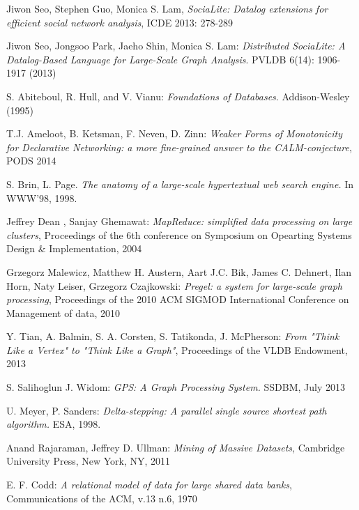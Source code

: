 
\begin{thebibliography}{99}


 Jiwon Seo, Stephen Guo, Monica S. Lam, \textit{SociaLite: Datalog extensions for efficient social network analysis}, ICDE 2013: 278-289

 Jiwon Seo, Jongsoo Park, Jaeho Shin, Monica S. Lam: \textit{Distributed SociaLite: A Datalog-Based Language for Large-Scale Graph Analysis}. PVLDB 6(14): 1906-1917 (2013)

 S. Abiteboul, R. Hull, and V. Vianu: \textit{Foundations of Databases}. Addison-Wesley (1995)

 T.J. Ameloot, B. Ketsman, F. Neven, D. Zinn: \textit{Weaker Forms of Monotonicity for Declarative Networking: a more fine-grained answer to the CALM-conjecture}, PODS 2014

 S. Brin, L. Page. \textit{The anatomy of a large-scale hypertextual web search engine.} In WWW’98, 1998.

 Jeffrey Dean , Sanjay Ghemawat: \textit{MapReduce: simplified data processing on large clusters}, Proceedings of the 6th conference on Symposium on Opearting Systems Design \& Implementation, 2004

 Grzegorz Malewicz, Matthew H. Austern, Aart J.C. Bik, James C. Dehnert, Ilan Horn, Naty Leiser, Grzegorz Czajkowski: \textit{Pregel: a system for large-scale graph processing}, Proceedings of the 2010 ACM SIGMOD International Conference on Management of data, 2010

 Y. Tian, A. Balmin, S. A. Corsten, S. Tatikonda, J. McPherson: \textit{From "Think Like a Vertex" to "Think Like a Graph"}, Proceedings of the VLDB Endowment, 2013

S. Salihoglun J. Widom: \textit{GPS: A Graph Processing System.} SSDBM, July 2013

 U. Meyer, P. Sanders: \textit{Delta-stepping: A parallel single source shortest path algorithm.} ESA, 1998.

 Anand Rajaraman, Jeffrey D. Ullman: \textit{Mining of Massive Datasets}, Cambridge University Press, New York, NY, 2011

 E. F. Codd: \textit{A relational model of data for large shared data banks}, Communications of the ACM, v.13 n.6, 1970


\end{thebibliography}
